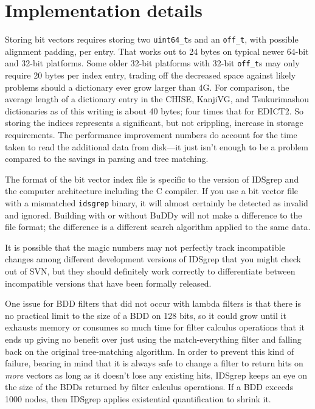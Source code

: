 \documentclass[twocolumn]{report}
\newcommand{\DangerousSection}{\marginpar{\large\hfill
\raisebox{-0.5\baselineskip}[0pt][0pt]{\dbend}\hfill\null}}
\begin{document}

\section{Implementation details}\DangerousSection

Storing bit vectors requires storing two \texttt{uint64\_t}s and an
\texttt{off\_t}, with possible alignment padding, per entry.  That works out
to 24 bytes on typical newer 64-bit and 32-bit platforms.  Some older 32-bit
platforms with 32-bit \texttt{off\_t}s may only require 20 bytes per index
entry, trading off the decreased space against likely problems should a
dictionary ever grow larger than 4G.  For comparison, the average length of
a dictionary entry in the CHISE, KanjiVG, and Tsukurimashou dictionaries as
of this writing is about 40 bytes; four times that for EDICT2.  So storing
the indices represents a significant, but not crippling, increase in storage
requirements.  The performance improvement numbers do account for the time
taken to read the additional data from disk---it just isn't enough to be a
problem compared to the savings in parsing and tree matching.

The format of the bit vector index file is specific to the version of
IDSgrep and the computer architecture including the C compiler.  If you use
a bit vector file with a mismatched \texttt{idsgrep} binary, it will almost
certainly be detected as invalid and ignored.  Building with or without
BuDDy will not make a difference to the file format; the difference is a
different search algorithm applied to the same data.

It is possible that the magic numbers may not
perfectly track incompatible changes among different development versions
of IDSgrep that you might check out of SVN, but they should definitely work
correctly to differentiate between incompatible versions that have been
formally released.

One issue for BDD filters that did not occur with lambda filters is that
there is no practical limit to the size of a BDD on 128 bits, so it could
grow until it exhausts memory or consumes so much time for filter calculus
operations that it ends up giving no benefit over just using the
match-everything filter and falling back on the original tree-matching
algorithm.  In order to prevent this kind of failure, bearing in mind that
it is always safe to change a filter to return hits on \emph{more} vectors as
long as it doesn't lose any existing hits, IDSgrep keeps an eye on the size
of the BDDs returned by filter calculus operations.  If a BDD exceeds 1000
nodes, then IDSgrep applies existential quantification to shrink it.
\end{document}
